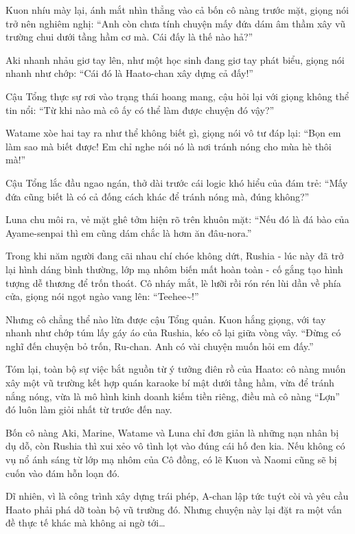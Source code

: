 \documentclass[../main.tex]{subfiles}
\begin{document}
Kuon nhíu mày lại, ánh mắt nhìn thẳng vào cả bốn cô nàng trước mặt, giọng nói trở nên nghiêm nghị: ``Anh còn chưa tính chuyện mấy đứa dám âm thầm xây vũ trường chui dưới tầng hầm cơ mà. Cái đấy là thế nào hả?''

Aki nhanh nhảu giơ tay lên, như một học sinh đang giơ tay phát biểu, giọng nói nhanh như chớp: ``Cái đó là Haato-chan xây dựng cả đấy!''

Cậu Tổng thực sự rơi vào trạng thái hoang mang, cậu hỏi lại với giọng không thể tin nổi: ``Từ khi nào mà cô ấy có thể làm được chuyện đó vậy?''

Watame xòe hai tay ra như thể không biết gì, giọng nói vô tư đáp lại: ``Bọn em làm sao mà biết được! Em chỉ nghe nói nó là nơi tránh nóng cho mùa hè thôi mà!''

Cậu Tổng lắc đầu ngao ngán, thở dài trước cái logic khó hiểu của đám trẻ: ``Mấy đứa cũng biết là có cả đống cách khác để tránh nóng mà, đúng không?''

Luna chu môi ra, vẻ mặt ghê tởm hiện rõ trên khuôn mặt: ``Nếu đó là đá bào của Ayame-senpai thì em cũng dám chắc là hơm ăn đâu-nora.''

Trong khi năm người đang cãi nhau chí chóe không dứt, Rushia - lúc này đã trở lại hình dáng bình thường, lớp mạ nhôm biến mất hoàn toàn - cố gắng tạo hình tượng dễ thương để trốn thoát. Cô nháy mắt, lè lưỡi rồi rón rén lùi dần về phía cửa, giọng nói ngọt ngào vang lên: ``Teehee\~{}!''


Nhưng cô chẳng thể nào lừa được cậu Tổng quản. Kuon hắng giọng, với tay nhanh như chớp túm lấy gáy áo của Rushia, kéo cô lại giữa vòng vây. ``Đừng có nghĩ đến chuyện bỏ trốn, Ru-chan. Anh có vài chuyện muốn hỏi em đấy.''

Tóm lại, toàn bộ sự việc bắt nguồn từ ý tưởng điên rồ của Haato: cô nàng muốn xây một vũ trường kết hợp quán karaoke bí mật dưới tầng hầm, vừa để tránh nắng nóng, vừa là mô hình kinh doanh kiếm tiền riêng, điều mà cô nàng ``Lợn'' đó luôn làm giỏi nhất từ trước đến nay.

Bốn cô nàng Aki, Marine, Watame và Luna chỉ đơn giản là những nạn nhân bị dụ dỗ, còn Rushia thì xui xẻo vô tình lọt vào đúng cái hố đen kia. Nếu không có vụ nổ ánh sáng từ lớp mạ nhôm của Cô đồng, có lẽ Kuon và Naomi cũng sẽ bị cuốn vào đám hỗn loạn đó.

Dĩ nhiên, vì là công trình xây dựng trái phép, A-chan lập tức tuýt còi và yêu cầu Haato phải phá dỡ toàn bộ vũ trường đó. Nhưng chuyện này lại đặt ra một vấn đề thực tế khác mà không ai ngờ tới\dots
\end{document}
